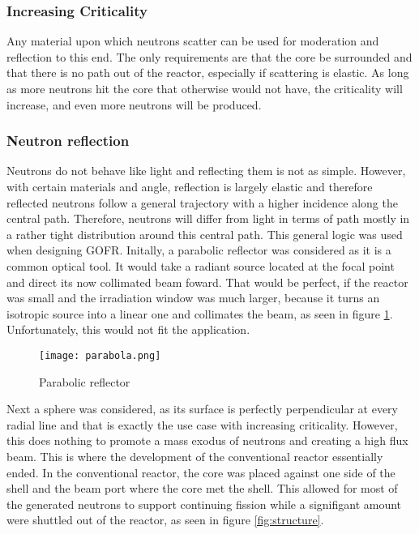 \subsubsection{Increasing Criticality}

Any material upon which neutrons scatter can be used for moderation and reflection to this end. The only requirements are that the core be surrounded and that there is no path out of the reactor, especially if scattering is elastic. As long as more neutrons hit the core that otherwise would not have, the criticality will increase, and even more neutrons will be produced.

\subsubsection{Neutron reflection}

Neutrons do not behave like light and reflecting them is not as simple. However, with certain materials and angle, reflection is largely elastic and therefore reflected neutrons follow a general trajectory with a higher incidence along the central path. Therefore, neutrons will differ from light in terms of path mostly in a rather tight distribution around this central path. This general logic was used when designing GOFR.
Initally, a parabolic reflector was considered as it is a common optical tool. It would take a radiant source located at the focal point and direct its now collimated beam foward. That would be perfect, if the reactor was small and the irradiation window was much larger, because it turns an isotropic source into a linear one and collimates the beam, as seen in figure \ref{fig:parabola}. Unfortunately, this would not fit the application. 

\begin{figure}[!htbp]
\caption{Parabolic reflector}
\label{fig:parabola}
\centering
\texttt{[image: parabola.png]}
\end{figure}

Next a sphere was considered, as its surface is perfectly perpendicular at every radial line and that is exactly the use case with increasing criticality. However, this does nothing to promote a mass exodus of neutrons and creating a high flux beam. This is where the development of the conventional reactor essentially ended. In the conventional reactor, the core was placed against one side of the shell and the beam port where the core met the shell. This allowed for most of the generated neutrons to support continuing fission while a signifigant amount were shuttled out of the reactor, as seen in figure \ref{fig:structure}.


